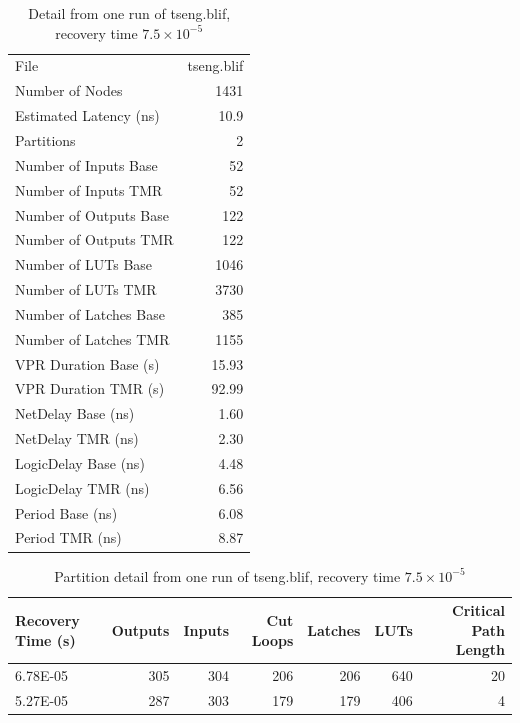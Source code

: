 \documentclass[12pt,final,oneside]{dwThesis} %
\begin{document}
   \begin{table}

      \begin{tabular}
         {lr} \toprule File & tseng.blif\\

         Number of Nodes & 1431\\
         Estimated Latency (ns)& 10.9\\
         Partitions &
         2\\
         Number of Inputs Base & 52\\
         Number of Inputs TMR & 52\\
         Number of
         Outputs Base & 122\\
         Number of Outputs TMR & 122\\
         Number of LUTs Base
         & 1046\\
         Number of LUTs TMR & 3730\\
         Number of Latches Base & 385\\

         Number of Latches TMR & 1155\\
         VPR Duration Base (s) & 15.93\\
         VPR
         Duration TMR (s) & 92.99\\
         NetDelay Base (ns) & 1.60\\
         NetDelay TMR
         (ns) & 2.30\\
         LogicDelay Base (ns) & 4.48\\
         LogicDelay TMR (ns) &
         6.56\\
         Period Base (ns) & 6.08\\
         Period TMR (ns) & 8.87\\
         \bottomrule

      \end{tabular}
      \caption{Detail from one run of tseng.blif, recovery time
         $7.5\times10^{-5}$}\label{tabSanity} 
   \end{table}



   \begin{table}

      \begin{tabular}
         {lrrrrrr} \toprule Recovery Time (s) &
         Outputs & Inputs & Cut Loops & Latches & \glspl{LUT} & Critical
         Path Length\\
         \midrule 6.78E-05 & 305 & 304 & 206 & 206 & 640 &
         20\\
         5.27E-05 & 287 & 303 & 179 & 179 & 406 & 4\\
         \bottomrule

      \end{tabular}
      \caption{Partition detail from one run of tseng.blif,
         recovery time $7.5\times10^{-5}$}\label{tabSanityPartitions}

   \end{table}
\end{document}
